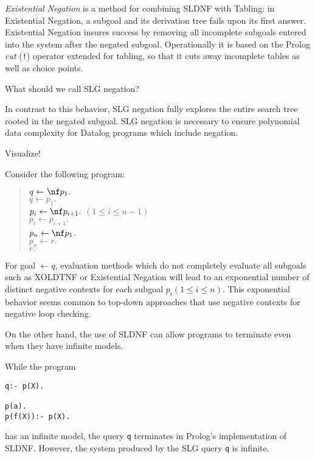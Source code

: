 {\em Existential Negation} is a method for combining SLDNF with
Tabling: in Existential Negation, a subgoal and its derivation tree
fails upon its first answer.  Existential Negation insures success by
removing all incomplete subgoals entered into the system after the
negated subgoal.  Operationally it is based on the Prolog {\em cut}
({\tt !}) operator extended for tabling, so that it cuts away
incomplete tables as well as choice points.

What should we call SLG negation?

In contrast to this behavior, SLG negation fully explores the entire
search tree rooted in the negated subgoal.  SLG negation is necessary
to ensure polynomial data complexity for Datalog programs which
include negation.

Visualize!

\begin{example}[\cite{CW93}] \rm \label{exponential}
Consider the following program:
\begin{verse}
$q \leftarrow \nf p_1.$ \\
$q \leftarrow p_1.$ \\
$p_{i} \leftarrow \nf p_{i+1}.$  \tab  $(1 \le i \le n-1)$ \\
$p_{i} \leftarrow p_{i+1}.$ \\
$p_n \leftarrow \nf p_1$. \\
$p_n \leftarrow r.$ \\
$r.$
\end{verse}
For goal $\leftarrow q$, evaluation methods which do not completely
evaluate all subgoals such as XOLDTNF \cite{CW92} or Existential
Negation will lead to an exponential number of distinct negative
contexts for each subgoal $p_i(1 \le i \le n)$.  This exponential
behavior seems common to top-down approaches that use negative
contexts for negative loop checking.
\end{example}

On the other hand, the use of SLDNF can allow programs to terminate
even when they have infinite models.

\begin{example} \rm \label{infinite-model}
While the program
\begin{verbatim}
q:- p(X).

p(a).
p(f(X)):- p(X).
\end{verbatim}
has an infinite model, the query {\tt \sldnf q} terminates in Prolog's 
implementation of SLDNF.  However, the system produced by the SLG query 
{\tt \nf q} is infinite.
\end{example}

